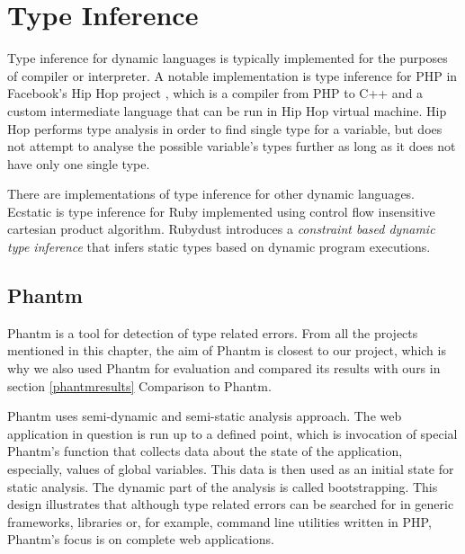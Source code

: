     \section{Type Inference}
    
    Type inference for dynamic languages is typically implemented 
    for the purposes of compiler or interpreter. A notable implementation 
    is type inference for PHP in Facebook's Hip Hop project \cite{zhao2012hiphop}, 
    which is a compiler from PHP to C++ and a custom intermediate language 
    that can be run in Hip Hop virtual machine. Hip Hop performs type 
    analysis in order to find single type for a variable, but does not attempt 
    to analyse the possible variable's types further as long as it 
    does not have only one single type. 
        
    There are implementations of type inference for other dynamic languages. 
    Ecstatic\cite{madsen2007ecstatic} is type inference for Ruby 
    implemented using control flow insensitive cartesian product algorithm. 
    Rubydust\cite{an2011dynamic} introduces a \emph{constraint based dynamic 
    type inference} that infers static types based on dynamic program 
    executions.

    \subsection{Phantm}
    
    Phantm\cite{kneuss2010phantm} is a tool for detection of type related 
    errors. From all the projects mentioned in this chapter, the aim of 
    Phantm is closest to our project, which is why we also used Phantm 
    for evaluation and compared its results with ours in 
    section \ref{phantmresults} Comparison to Phantm.
    
    Phantm uses semi-dynamic and semi-static analysis approach. The web 
    application in question is run up to a defined point, which is invocation 
    of special Phantm's function that collects data about the state of the application, 
    especially, values of global variables. This data is then used as an initial 
    state for static analysis. The dynamic part of the analysis is called bootstrapping. 
    This design illustrates that although type related errors can be searched for 
    in generic frameworks, libraries or, for example, command line utilities 
    written in PHP, Phantm's focus is on complete web applications.
    
    
    
    
    
    
    
